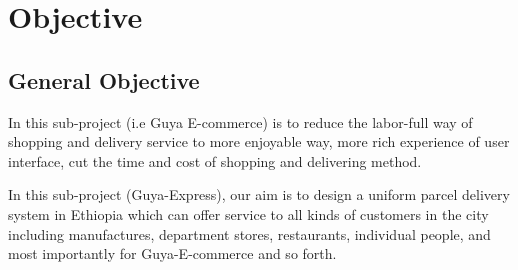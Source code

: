 \section{Objective}

\subsection{General Objective}
In this sub-project (i.e Guya E-commerce) is to reduce the labor-full way of shopping and
delivery service to more enjoyable way, more rich experience of user interface, cut
the time and cost of shopping and delivering method.

In this sub-project (Guya-Express), our aim is to design a uniform parcel delivery system in Ethiopia which can offer service to all kinds of customers in the city including manufactures, department stores, restaurants, individual people, and most importantly for Guya-E-commerce and so forth.

